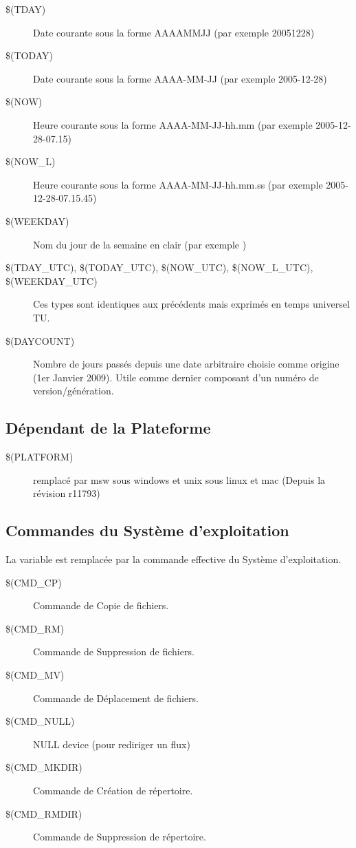 \begin{description}
\item[{\footnotesize \$(TDAY)}] Date courante sous la forme AAAAMMJJ (par exemple 20051228)
\item[{\footnotesize \$(TODAY)}] Date courante sous la forme AAAA-MM-JJ (par exemple 2005-12-28)
\item[{\footnotesize \$(NOW)}] Heure courante sous la forme AAAA-MM-JJ-hh.mm (par exemple 2005-12-28-07.15)
\item[{\footnotesize \$(NOW\_L)}] Heure courante sous la forme AAAA-MM-JJ-hh.mm.ss (par exemple 2005-12-28-07.15.45)
\item[{\footnotesize \$(WEEKDAY)}]  Nom du jour de la semaine en clair (par exemple )
\item[{\footnotesize \$(TDAY\_UTC), \$(TODAY\_UTC), \$(NOW\_UTC), \$(NOW\_L\_UTC), \$(WEEKDAY\_UTC)}] Ces types sont identiques aux précédents mais exprimés en temps universel TU.
\item[{\footnotesize \$(DAYCOUNT)}] Nombre de jours passés depuis une date arbitraire choisie comme origine (1er Janvier 2009). Utile comme dernier composant d'un numéro de version/génération.
\end{description}

\subsection{Dépendant de la Plateforme}

\begin{description}
\item[{\footnotesize \$(PLATFORM)}] remplacé par msw sous windows et unix sous linux et mac (Depuis la révision r11793) 
\end{description}

\subsection{Commandes du Système d'exploitation}
La variable est remplacée par la commande effective du Système d'exploitation.
\begin{description}
\item[{\footnotesize \$(CMD\_CP)}] Commande de Copie de fichiers.
\item[{\footnotesize \$(CMD\_RM)}] Commande de Suppression de fichiers.
\item[{\footnotesize \$(CMD\_MV)}] Commande de Déplacement de fichiers.
\item[{\footnotesize \$(CMD\_NULL)}] NULL device (pour rediriger un flux)
\item[{\footnotesize \$(CMD\_MKDIR)}] Commande de Création de répertoire.
\item[{\footnotesize \$(CMD\_RMDIR)}] Commande de Suppression de répertoire.
\end{description}

